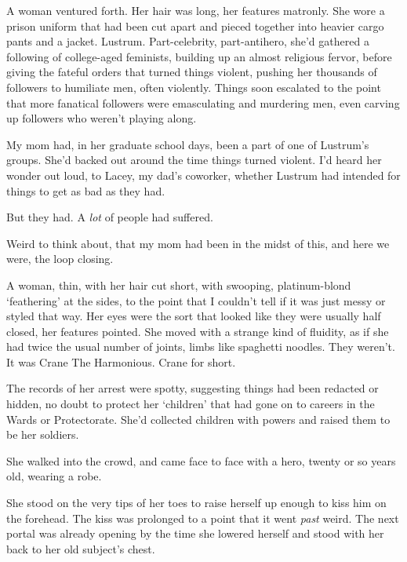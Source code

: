 A woman ventured forth.  Her hair was long, her features matronly.  She wore a prison uniform that had been cut apart and pieced together into heavier cargo pants and a jacket.  Lustrum.  Part-celebrity, part-antihero, she'd gathered a following of college-aged feminists, building up an almost religious fervor, before giving the fateful orders that turned things violent, pushing her thousands of followers to humiliate men, often violently.  Things soon escalated to the point that more fanatical followers were emasculating and murdering men, even carving up followers who weren't playing along.



My mom had, in her graduate school days, been a part of one of Lustrum's groups.  She'd backed out around the time things turned violent.  I'd heard her wonder out loud, to Lacey, my dad's coworker, whether Lustrum had intended for things to get as bad as they had.



But they had.  A \emph{lot} of people had suffered.



Weird to think about, that my mom had been in the midst of this, and here we were, the loop closing.



A woman, thin, with her hair cut short, with swooping, platinum-blond `feathering' at the sides, to the point that I couldn't tell if it was just messy or styled that way.  Her eyes were the sort that looked like they were usually half closed, her features pointed.   She moved with a strange kind of fluidity, as if she had twice the usual number of joints, limbs like spaghetti noodles.  They weren't.  It was Crane The Harmonious.  Crane for short.



The records of her arrest were spotty, suggesting things had been redacted or hidden, no doubt to protect her `children' that had gone on to careers in the Wards or Protectorate.  She'd collected children with powers and raised them to be her soldiers.



She walked into the crowd, and came face to face with a hero, twenty or so years old, wearing a robe.



She stood on the very tips of her toes to raise herself up enough to kiss him on the forehead.  The kiss was prolonged to a point that it went \emph{past} weird.  The next portal was already opening by the time she lowered herself and stood with her back to her old subject's chest.



